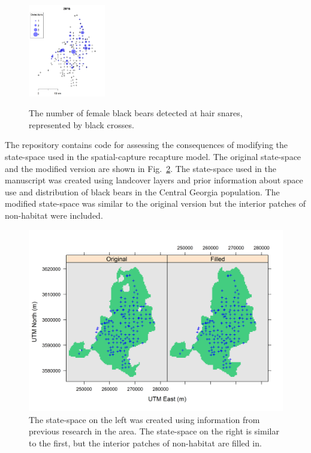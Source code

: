 \documentclass[12pt]{article}
\begin{document}
\begin{figure}[h!]
  {\includegraphics[width=0.3\textwidth]{figs/dets2016}} %
  \caption{The number of female black bears detected at hair
    snares, represented by black crosses.}
  \label{fig:detmaps}
\end{figure}

\clearpage

The repository contains code for assessing the consequences of
modifying the state-space used in the spatial-capture recapture model.
The original state-space and the modified version are shown in  
Fig.~\ref{fig:2ss}. The state-space used in the manuscript was
created using landcover layers and prior information about 
space use and distribution of black bears in the Central Georgia
population. The modified state-space was similar to the original
version but the interior patches of non-habitat were included.  

\begin{figure}[h]
  \centering
  \includegraphics[width=\textwidth]{figs/state-spaces}
  \caption{The state-space on the left was created using information
    from previous research in the area. The state-space on the right
    is similar to the first, but the interior patches of non-habitat
    are filled in.}   
  \label{fig:2ss}
\end{figure}
\end{document}
